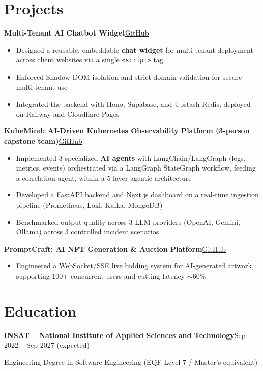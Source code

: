 \documentclass[10pt,a4paper]{article}
\newcommand{\entry}[2]{\vspace{1pt}\noindent\textbf{#1}\hfill{\color{muted}#2}\par}
\newcommand{\gh}[1]{\href{https://github.com/Hsan003/#1}{GitHub}}
\begin{document}
\section{Projects}
\entry{Multi-Tenant AI Chatbot Widget}{\gh{AI-Assistant-Backend}}
\begin{itemize}
  \item Designed a reusable, embeddable \textbf{chat widget} for multi-tenant deployment across client websites via a single \texttt{<script>} tag
  \item Enforced Shadow DOM isolation and strict domain validation for secure multi-tenant use
  \item Integrated the backend with Hono, Supabase, and Upstash Redis; deployed on Railway and Cloudflare Pages
\end{itemize}
\entry{KubeMind: AI-Driven Kubernetes Observability Platform (3-person capstone team)}{\gh{kubemind}}
\begin{itemize}
  \item Implemented 3 specialized \textbf{AI agents} with LangChain/LangGraph (logs, metrics, events) orchestrated via a LangGraph StateGraph workflow, feeding a correlation agent, within a 5-layer agentic architecture
  \item Developed a FastAPI backend and Next.js dashboard on a real-time ingestion pipeline (Prometheus, Loki, Kafka, MongoDB)
  \item Benchmarked output quality across 3 LLM providers (OpenAI, Gemini, Ollama) across 3 controlled incident scenarios
\end{itemize}
\entry{PromptCraft: AI NFT Generation \& Auction Platform}{\gh{prompt-craft-back}}
\begin{itemize}
  \item Engineered a WebSocket/SSE live bidding system for AI-generated artwork, supporting 100+ concurrent users and cutting latency $\sim$60\%
\end{itemize}

\section{Education}
\entry{INSAT -- National Institute of Applied Sciences and Technology}{Sep 2022 -- Sep 2027 (expected)}
Engineering Degree in Software Engineering (EQF Level 7 / Master's equivalent)
\end{document}
